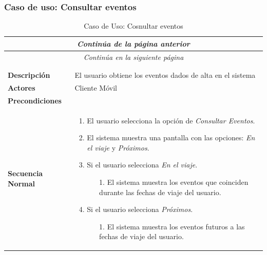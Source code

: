 


\newpage
\subsubsection*{Caso de uso: Consultar eventos}
\begin{longtable}{| p{4cm} | p{10cm} |}
\endfirsthead
\multicolumn{2}{c}{\textit{Continúa de la página anterior}}\\[12pt]
\hline
\endhead
\hline
\multicolumn{2}{c}{\textit{Continúa en la siguiente página}} \\
\endfoot
\hline
\caption{Caso de Uso: Cosnultar eventos}\label{fig:1}\\
\endlastfoot


\hline
\multicolumn{2}{|c|}{\textbf{CU$<$10$>$ - Consultar Eventos}} \\

\hline
\textbf{Descripción} &
El usuario obtiene los eventos dados de alta en el sistema\\

\hline
\textbf{Actores} &
Cliente Móvil\\

\hline
\textbf{Precondiciones} &
\\

\hline
\textbf{Secuencia Normal} &\mbox{}\par\vspace{-\baselineskip}
\begin{enumerate}[leftmargin=0.7cm, topsep=0.1cm]
\item El usuario selecciona la opción de \textit{Consultar Eventos}.
\item El sistema muestra una pantalla con las opciones: \textit{En el viaje} y \textit{Próximos}.
\item Si el usuario selecciona \textit{En el viaje}.
	\begin{itemize}
	\item[1.] El sistema muestra los eventos que coinciden durante las fechas de viaje del usuario.
	\end{itemize}
\item Si el usuario selecciona \textit{Próximos}.
	\begin{itemize}
	\item[1.] El sistema muestra los eventos futuros a las fechas de viaje del usuario.
	\end{itemize}
\end{enumerate}\\


\end{longtable}
